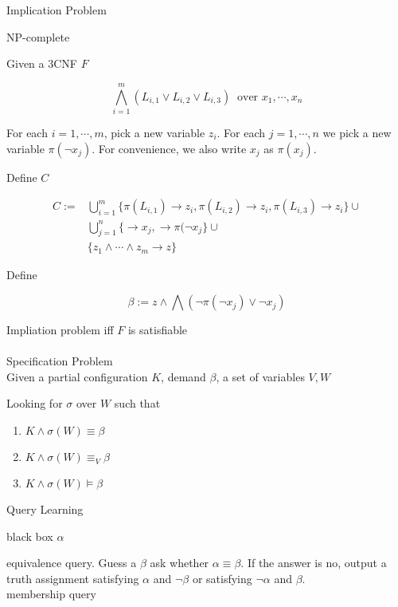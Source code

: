 \documentclass[12pt]{article}
\begin{document}
{Implication Problem

NP-complete  

Given a 3CNF  $F$

$$\bigwedge_{i=1}^m (L_{i,1}\vee L_{i,2}\vee L_{i,3}) \ \mbox{ over } x_1,\cdots, x_n$$

For each $i=1,\cdots,m$, pick a new variable $z_i$. For each $j=1,\cdots, n$ we pick a new variable $\pi(\neg x_j)$. For convenience, we also write $x_j$ as $\pi(x_j)$. 

Define $C$ 

$$\begin{array}{ll}C:=&
\bigcup_{i=1}^m\{\pi(L_{i,1})\rightarrow z_i, \pi(L_{i,2})\rightarrow z_i, \pi(L_{i,3})\rightarrow z_i\}\cup\\ & \bigcup_{j=1}^n\{\rightarrow x_j, \rightarrow \pi(\neg x_j\} \cup\\ &
\{z_1\wedge\cdots\wedge z_m\rightarrow z\}\end{array}$$

Define 

$$\beta:=z\wedge\bigwedge (\neg \pi(\neg x_j)\vee \neg x_j)$$


Impliation problem iff $F$ is satisfiable \\


\ \\


Specification Problem\\

Given a partial configuration $K$, demand $\beta$, a set of variables $V,W$

Looking for $\sigma$ over $W$ such that

\begin{enumerate}
\item $K\wedge \sigma(W)\equiv \beta$

\item $K\wedge\sigma(W) \equiv_V\beta$

\item $K\wedge\sigma(W)\models \beta$
\end{enumerate}


Query Learning 

black box $\alpha$   

equivalence query. Guess a $\beta$ ask whether $\alpha\equiv \beta$. If the answer is no, output a truth assignment satisfying $\alpha$ and $\neg \beta$ or satisfying $\neg\alpha$ and $\beta$.\\

membership query

}
\end{document}
